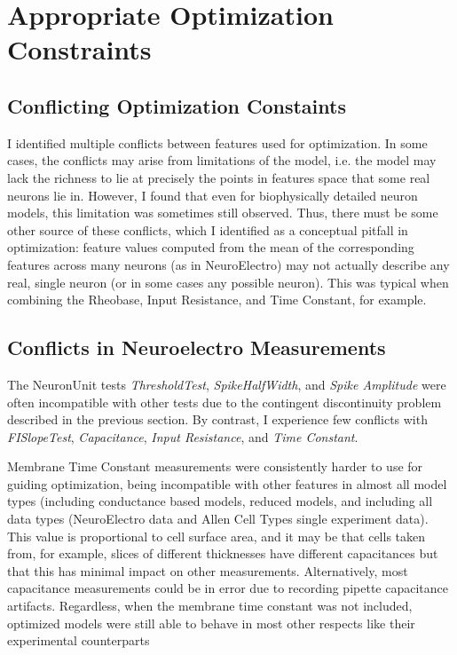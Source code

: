 \section{Appropriate Optimization Constraints}
\subsection{Conflicting Optimization Constaints}
I identified multiple conflicts between features used for optimization.
In some cases, the conflicts may arise from limitations of the model, i.e. the model may lack the richness to lie at precisely the points in features space that some real neurons lie in.
However, I found that even for biophysically detailed neuron models, this limitation was sometimes still observed.
Thus, there must be some other source of these conflicts, which I identified as a conceptual pitfall in optimization: feature values computed from the mean of the corresponding features across many neurons (as in NeuroElectro) may not actually describe any real, single neuron (or in some cases any possible neuron). 
This was typical when combining the Rheobase, Input Resistance, and Time Constant, for example.

\subsection{Conflicts in Neuroelectro Measurements}
The NeuronUnit tests \emph{ThresholdTest},  \emph{SpikeHalfWidth}, and \emph{Spike Amplitude} were often incompatible with other tests due to the contingent discontinuity problem described in the previous section.
By contrast, I experience few conflicts with \emph{FISlopeTest},  \emph{Capacitance},  \emph{Input Resistance}, and  \emph{Time Constant}.

Membrane Time Constant measurements were consistently harder to use for guiding optimization, being incompatible with other features in almost all model types (including conductance based models, reduced models, and including all data types (NeuroElectro data and Allen Cell Types single experiment data).
This value is proportional to cell surface area, and it may be that cells taken from, for example, slices of different thicknesses have different capacitances but that this has minimal impact on other measurements.
Alternatively, most capacitance measurements could be in error due to recording pipette capacitance artifacts.
Regardless, when the membrane time constant was not included, optimized models were still able to behave in most other respects like their experimental counterparts

